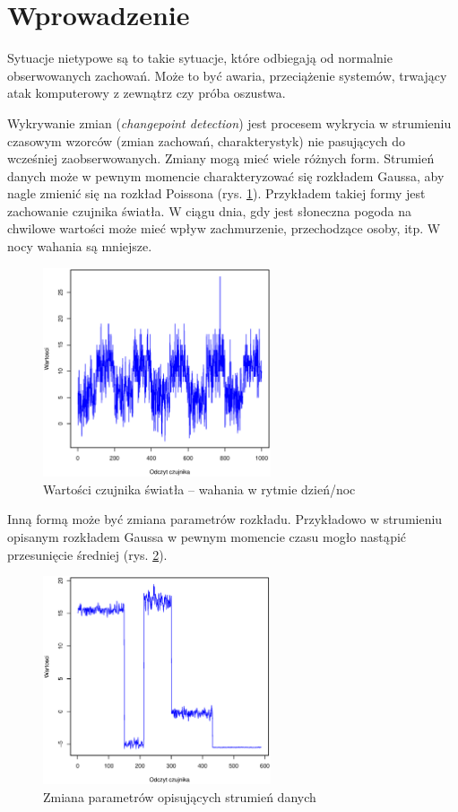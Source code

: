 \section{Wprowadzenie}

Sytuacje nietypowe są to takie sytuacje,
które odbiegają od normalnie obserwowanych zachowań.
Może to być awaria, przeciążenie systemów,
trwający atak komputerowy z zewnątrz czy próba oszustwa.

Wykrywanie zmian (\textit{changepoint detection}) jest procesem
wykrycia w strumieniu czasowym wzorców (zmian zachowań, charakterystyk) nie pasujących do wcześniej zaobserwowanych.
Zmiany mogą mieć wiele różnych form.
Strumień danych może w pewnym momencie charakteryzować się rozkładem Gaussa,
aby nagle zmienić się na rozkład Poissona (rys. \ref{fig:SignalDist}).
Przykładem takiej formy jest zachowanie czujnika światła.
W ciągu dnia, gdy jest słoneczna pogoda na chwilowe wartości może mieć wpływ zachmurzenie, przechodzące osoby, itp.
W nocy wahania są mniejsze.
\begin{figure}[htbp]
\centering
	\includegraphics[width=0.6\textwidth]{img/ch-2-dist}
	\caption{Wartości czujnika światła -- wahania w rytmie dzień/noc}
  \label{fig:SignalDist}
\end{figure}
Inną formą może być zmiana parametrów rozkładu.
Przykładowo w strumieniu opisanym rozkładem Gaussa
w pewnym momencie czasu mogło nastąpić przesunięcie średniej (rys. \ref{fig:SignalData}).
\begin{figure}[htbp]
\centering
	\includegraphics[width=0.6\textwidth]{img/ch-2-data}
	\caption{Zmiana parametrów opisujących strumień danych}
  \label{fig:SignalData}
\end{figure}

